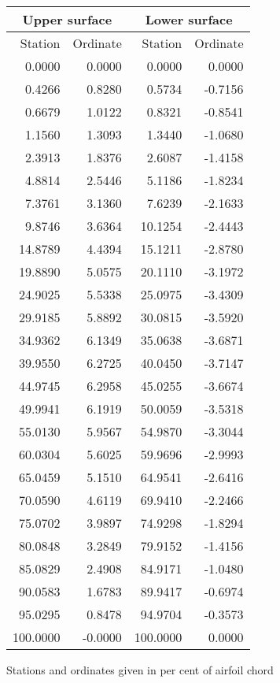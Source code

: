 \documentclass[11pt]{book}
\begin{document}
 \hspace{4mm}
 \begin{tabular}{|r|r|r|r|} \hline 
 \multicolumn{2}{|c|}{Upper surface} & \multicolumn{2}{|c|}{Lower surface} \\
 \hline
 Station & Ordinate & Station & Ordinate \\
 \hline
0.0000 & 0.0000 & 0.0000 & 0.0000 \\
0.4266 & 0.8280 & 0.5734 & -0.7156 \\
0.6679 & 1.0122 & 0.8321 & -0.8541 \\
1.1560 & 1.3093 & 1.3440 & -1.0680 \\
2.3913 & 1.8376 & 2.6087 & -1.4158 \\
4.8814 & 2.5446 & 5.1186 & -1.8234 \\
7.3761 & 3.1360 & 7.6239 & -2.1633 \\
9.8746 & 3.6364 & 10.1254 & -2.4443 \\
14.8789 & 4.4394 & 15.1211 & -2.8780 \\
19.8890 & 5.0575 & 20.1110 & -3.1972 \\
24.9025 & 5.5338 & 25.0975 & -3.4309 \\
29.9185 & 5.8892 & 30.0815 & -3.5920 \\
34.9362 & 6.1349 & 35.0638 & -3.6871 \\
39.9550 & 6.2725 & 40.0450 & -3.7147 \\
44.9745 & 6.2958 & 45.0255 & -3.6674 \\
49.9941 & 6.1919 & 50.0059 & -3.5318 \\
55.0130 & 5.9567 & 54.9870 & -3.3044 \\
60.0304 & 5.6025 & 59.9696 & -2.9993 \\
65.0459 & 5.1510 & 64.9541 & -2.6416 \\
70.0590 & 4.6119 & 69.9410 & -2.2466 \\
75.0702 & 3.9897 & 74.9298 & -1.8294 \\
80.0848 & 3.2849 & 79.9152 & -1.4156 \\
85.0829 & 2.4908 & 84.9171 & -1.0480 \\
90.0583 & 1.6783 & 89.9417 & -0.6974 \\
95.0295 & 0.8478 & 94.9704 & -0.3573 \\
100.0000 & -0.0000 & 100.0000 & 0.0000 \\
 \hline 
 \end{tabular}
 \vspace{8mm}

Stations and ordinates given in per cent of airfoil chord
\end{document}
